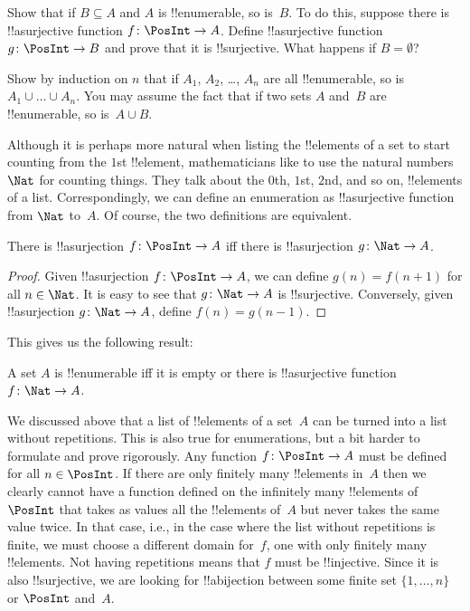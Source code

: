 \begin{prob}
  Show that if $B \subseteq A$ and $A$ is !!{enumerable}, so is~$B$. To
  do this, suppose there is !!a{surjective} function $f\colon \PosInt \to
  A$. Define !!a{surjective} function~$g\colon \PosInt \to B$ and prove
  that it is !!{surjective}. What happens if $B = \emptyset$?
\end{prob}
    
\begin{prob}
  Show by induction on $n$ that if $A_1$, $A_2$, \dots, $A_n$ are all
  !!{enumerable}, so is $A_1 \cup \dots \cup A_n$. You may assume the
  fact that if two sets $A$ and~$B$ are !!{enumerable}, so is~$A \cup
  B$. 
\end{prob}

Although it is perhaps more natural when listing the !!{element}s of a
set to start counting from the $1$st !!{element}, mathematicians like
to use the natural numbers~$\Nat$ for counting things. They
talk about the $0$th, $1$st, $2$nd, and so on, !!{element}s of a list.
Correspondingly, we can define an enumeration as !!a{surjective}
function from $\Nat$ to~$A$. Of course, the two definitions are
equivalent.

\begin{prop}
  There is !!a{surjection} $f\colon \PosInt \to A$ iff there is
  !!a{surjection} $g\colon \Nat \to A$.
\end{prop}

\begin{proof}
  Given !!a{surjection} $f\colon \PosInt \to A$, we can define $g(n) =
  f(n+1)$ for all $n \in \Nat$. It is easy to see that $g\colon \Nat
  \to A$ is !!{surjective}. Conversely, given !!a{surjection} $g\colon
  \Nat \to A$, define $f(n) = g(n-1)$.
\end{proof}

This gives us the following result:

\begin{cor}
A set $A$ is !!{enumerable} iff it is empty or there is
!!a{surjective} function $f\colon \Nat \to A$.
\end{cor}

We discussed above that a list of !!{element}s of a set~$A$ can be
turned into a list without repetitions. This is also true for
enumerations, but a bit harder to formulate and prove rigorously. Any
function $f\colon \PosInt \to A$ must be defined for all $n \in
\PosInt$. If there are only finitely many !!{element}s in~$A$ then we
clearly cannot have a function defined on the infinitely many
!!{element}s of~$\PosInt$ that takes as values all the !!{element}s
of~$A$ but never takes the same value twice. In that case, i.e., in
the case where the list without repetitions is finite, we must choose
a different domain for~$f$, one with only finitely many !!{element}s.
Not having repetitions means that $f$ must be !!{injective}. Since it
is also !!{surjective}, we are looking for !!a{bijection} between some
finite set $\{1, \dots, n\}$ or $\PosInt$ and~$A$.

